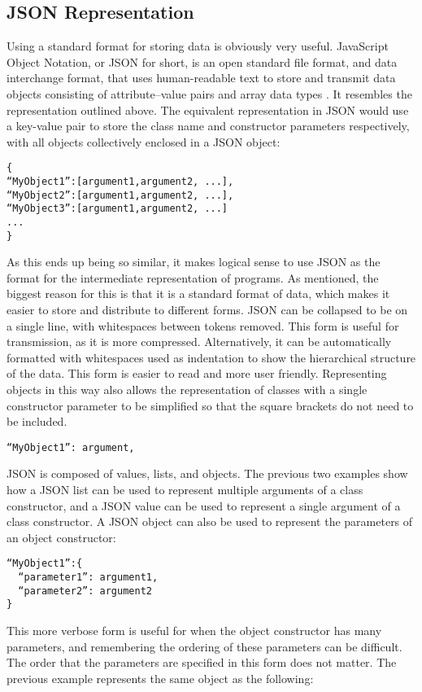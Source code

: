 \subsection{JSON Representation}
Using a standard format for storing data is obviously very useful. JavaScript Object Notation, or JSON for short, is an open standard file format, and data interchange format, that uses human-readable text to store and transmit data objects consisting of attribute–value pairs and array data types \cite{json}. It resembles the representation outlined above. The equivalent representation in JSON would use a key-value pair to store the class name and constructor parameters respectively, with all objects collectively enclosed in a JSON object:
\begin{verbatim}
{
“MyObject1”:[argument1,argument2, ...],
“MyObject2”:[argument1,argument2, ...],
“MyObject3”:[argument1,argument2, ...]
...
}
\end{verbatim}
As this ends up being so similar, it makes logical sense to use JSON as the format for the intermediate representation of programs. As mentioned, the biggest reason for this is that it is a standard format of data, which makes it easier to store and distribute to different forms. JSON can be collapsed to be on a single line, with whitespaces between tokens removed. This form is useful for transmission, as it is more compressed. Alternatively, it can be automatically formatted with whitespaces used as indentation to show the hierarchical structure of the data. This form is easier to read and more user friendly. Representing objects in this way also allows the representation of classes with a single constructor parameter to be simplified so that the square brackets do not need to be included.
\begin{verbatim}
“MyObject1”: argument,
\end{verbatim}
JSON is composed of values, lists, and objects. The previous two examples show how a JSON list can be used to represent multiple arguments of a class constructor, and a JSON value can be used to represent a single argument of a class constructor. A JSON object can also be used to represent the parameters of an object constructor:
\begin{verbatim}
“MyObject1”:{
  “parameter1”: argument1,
  “parameter2”: argument2
}
\end{verbatim}
This more verbose form is useful for when the object constructor has many parameters, and remembering the ordering of these parameters can be difficult. The order that the parameters are specified in this form does not matter. The previous example represents the same object as the following:
